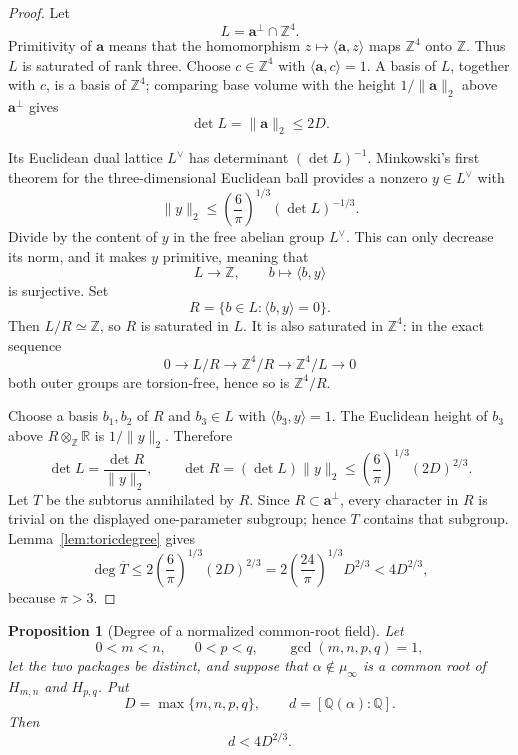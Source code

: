 \documentclass[11pt]{article}
\numberwithin{equation}{section}
\newtheorem{proposition}[theorem]{Proposition}
\theoremstyle{definition}
\newcommand{\Q}{\mathbb Q}
\newcommand{\Z}{\mathbb Z}
\begin{document}
\begin{proof}
Let
\[
 L=\boldsymbol a^\perp\cap\Z^4.
\]
Primitivity of \(\boldsymbol a\) means that the homomorphism
\(z\mapsto\langle\boldsymbol a,z\rangle\) maps \(\Z^4\) onto \(\Z\).
Thus \(L\) is saturated of rank three.  Choose \(c\in\Z^4\) with
\(\langle\boldsymbol a,c\rangle=1\).  A basis of \(L\), together with
\(c\), is a basis of \(\Z^4\); comparing base volume with the height
\(1/\|\boldsymbol a\|_2\) above \(\boldsymbol a^\perp\) gives
\[
 \det L=\|\boldsymbol a\|_2\leq2D.
\]

Its Euclidean dual lattice \(L^\vee\) has determinant
\((\det L)^{-1}\).  Minkowski's first theorem for the three-dimensional
Euclidean ball \cite[Chapter~III, \S2]{Cassels1997} provides a nonzero
\(y\in L^\vee\) with
\[
 \|y\|_2\leq
 \left(\frac6\pi\right)^{1/3}(\det L)^{-1/3}.
\]
Divide by the content of \(y\) in the free abelian group \(L^\vee\).
This can only decrease its norm, and it makes \(y\) primitive, meaning that
\[
 L\longrightarrow\Z,
 \qquad b\longmapsto\langle b,y\rangle
\]
is surjective.  Set
\[
 R=\{b\in L:\langle b,y\rangle=0\}.
\]
Then \(L/R\simeq\Z\), so \(R\) is saturated in \(L\).  It is also
saturated in \(\Z^4\): in the exact sequence
\[
 0\longrightarrow L/R\longrightarrow\Z^4/R
 \longrightarrow\Z^4/L\longrightarrow0
\]
both outer groups are torsion-free, hence so is \(\Z^4/R\).

Choose a basis \(b_1,b_2\) of \(R\) and \(b_3\in L\) with
\(\langle b_3,y\rangle=1\).  The Euclidean height of \(b_3\) above
\(R\otimes_{\Z}\mathbb R\) is \(1/\|y\|_2\).  Therefore
\[
 \det L=\frac{\det R}{\|y\|_2},
 \qquad
 \det R=(\det L)\|y\|_2
 \leq\left(\frac6\pi\right)^{1/3}(2D)^{2/3}.
\]
Let \(T\) be the subtorus annihilated by \(R\).  Since
\(R\subset\boldsymbol a^\perp\), every character in \(R\) is trivial on
the displayed one-parameter subgroup; hence \(T\) contains that subgroup.
Lemma~\ref{lem:toricdegree} gives
\[
 \deg\overline T
 \leq2\left(\frac6\pi\right)^{1/3}(2D)^{2/3}
 =2\left(\frac{24}{\pi}\right)^{1/3}D^{2/3}
 <4D^{2/3},
\]
because \(\pi>3\).
\end{proof}

\begin{proposition}[Degree of a normalized common-root field]
\label{prop:fielddegree}
Let
\[
 0<m<n,\qquad0<p<q,\qquad\gcd(m,n,p,q)=1,
\]
let the two packages be distinct, and suppose that
\(\alpha\notin\mu_\infty\) is a common root of
\(H_{m,n}\) and \(H_{p,q}\).  Put
\[
 D=\max\{m,n,p,q\},
 \qquad d=[\Q(\alpha):\Q].
\]
Then
\begin{equation}
 d<4D^{2/3}.
 \label{eq:17-10}
\end{equation}
\end{proposition}
\end{document}
